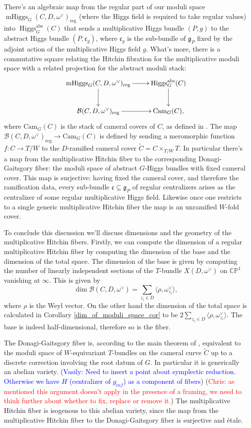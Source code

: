 \documentclass[11pt, oneside, reqno]{amsart}
\theoremstyle{definition} \newtheorem{definition}{Definition}[section]
\theoremstyle{definition} \newtheorem{remark}[definition]{Remark}
\theoremstyle{definition} \newtheorem{remarks}[definition]{Remarks}
\theoremstyle{definition} \newtheorem{question}[definition]{Question}
\theoremstyle{definition} \newtheorem*{note}{Note}
\theoremstyle{definition} \newtheorem{example}[definition]{Example}
\theoremstyle{definition} \newtheorem{examples}[definition]{Examples}
\renewcommand{\gg}{\mathfrak{g}}
\newcommand{\bb}[1]{\mathbb{#1}}
\newcommand{\mr}[1]{\mathrm{#1}}
\newcommand{\mc}[1]{\mathcal{#1}}
\newcommand{\mf}[1]{\mathfrak{#1}}
\newcommand{\wt}[1]{\widetilde{#1}}
\newcommand{\sub}{\subseteq}
\DeclareMathOperator{\higgs}{Higgs}
\DeclareMathOperator{\mhiggs}{mHiggs}
\newcommand{\chris}[1]{(\textcolor{red}{Chris: #1})}
\newcommand{\vasily}[1]{(\textcolor{blue}{Vasily: #1})}
\begin{document}
There's an algebraic map from the regular part of our moduli space $\mhiggs_G(C,D,\omega^\vee)_{\mr{reg}}$ (where the Higgs field is required to take regular values) into $\higgs_G^{\mr{abs}}(C)$ that sends a multiplicative Higgs bundle $(P,g)$ to the abstract Higgs bundle $(P, \mf c_g)$, where $\mf c_g$ is the sub-bundle of $\gg_P$ fixed by the adjoint action of the multiplicative Higgs field $g$.  What's more, there is a commutative square relating the Hitchin fibration for the multiplicative moduli space with a related projection for the abstract moduli stack:
\[\xymatrix{
\mhiggs_G(C,D,\omega^\vee)_{\mr{reg}} \ar[r] \ar[d] &\higgs_G^{\mr{abs}}(C) \ar[d] \\
\mc B(C,D,\omega^\vee)_{\mr{reg}} \ar[r] &\mr{Cam}_G(C),
}\]
where $\mr{Cam}_G(C)$ is the stack of cameral covers of $C$, as defined in \cite[Section 2.8]{DonagiGaitsgory}.  The map $\mc B(C,D,\omega^\vee)_{\mr{reg}} \to \mr{Cam}_G(C)$ is defined by sending a meromorphic function $f \colon C \to T/W$ to the $D$-ramified cameral cover $\wt C = C \times_{T/W} T$.  In particular there's a map from the multiplicative Hitchin fiber to the corresponding Donagi-Gaitsgory fiber: the moduli space of abstract $G$-Higgs bundles with fixed cameral cover.  This map is surjective: having fixed the cameral cover, and therefore the ramification data, every sub-bundle $\mf c \sub \gg_P$ of regular centralizers arises as the centralizer of some regular multiplicative Higgs field.  Likewise once one restricts to a single generic multiplicative Hitchin fiber the map is an unramified $W$-fold cover.

To conclude this discussion we'll discuss dimensions and the geometry of the multiplicative Hitchin fibers.  Firstly, we can compute the dimension of a regular multiplicative Hitchin fiber by computing the dimension of the base and the dimension of the total space.  The dimension of the base is given by computing the number of linearly independent sections of the $T$-bundle $X(D,\omega^\vee)$ on $\bb{CP}^1$ vanishing at $\infty$.  This is given by 
\[\dim \mc B(C,D,\omega^\vee) = \sum_{z_i \in D} \langle \rho, \omega^\vee_{z_i} \rangle,\]
where $\rho$ is the Weyl vector.  On the other hand the dimension of the total space is calculated in Corollary \ref{dim_of_moduli_space_cor} to be $2 \sum_{z_i \in D} \langle \rho, \omega^\vee_{z_i} \rangle$.  The base is indeed half-dimensional, therefore so is the fiber.

The Donagi-Gaitsgory fiber is, according to the main theorem of \cite{DonagiGaitsgory}, equivalent to the moduli space of $W$-equivariant $T$-bundles on the cameral curve $\wt C$ up to a discrete correction involving the root datum of $G$.  In particular it is generically an abelian variety.  \vasily{Need to insert a point about symplectic reduction. Otherwise we have $H$
 (centralizer of $g_{inf}$) as a component of fibers} \chris{as mentioned this argument doesn't apply in the presence of a framing, we need to think further about whether to fix, replace or remove it.}
The multiplicative Hitchin fiber is isogenous to this abelian variety, since the map from the multiplicative Hitchin fiber to the Donagi-Gaitsgory fiber is surjective and \'etale.
\end{document}
